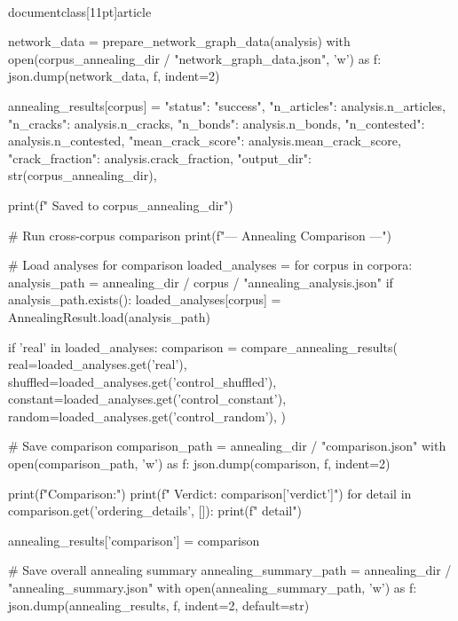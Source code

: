 \\documentclass[11pt]{article}
\begin{document}
\begin{CodeBlock}
                network_data = prepare_network_graph_data(analysis)
                with open(corpus_annealing_dir / "network_graph_data.json", 'w') as f:
                    json.dump(network_data, f, indent=2)

                annealing_results[corpus] = {
                    "status": "success",
                    "n_articles": analysis.n_articles,
                    "n_cracks": analysis.n_cracks,
                    "n_bonds": analysis.n_bonds,
                    "n_contested": analysis.n_contested,
                    "mean_crack_score": analysis.mean_crack_score,
                    "crack_fraction": analysis.crack_fraction,
                    "output_dir": str(corpus_annealing_dir),
                }

                print(f"  Saved to {corpus_annealing_dir}")
            
            # Run cross-corpus comparison
            print(f"\n--- Annealing Comparison ---")

            # Load analyses for comparison
            loaded_analyses = {}
            for corpus in corpora:
                analysis_path = annealing_dir / corpus / "annealing_analysis.json"
                if analysis_path.exists():
                    loaded_analyses[corpus] = AnnealingResult.load(analysis_path)

            if 'real' in loaded_analyses:
                comparison = compare_annealing_results(
                    real=loaded_analyses.get('real'),
                    shuffled=loaded_analyses.get('control_shuffled'),
                    constant=loaded_analyses.get('control_constant'),
                    random=loaded_analyses.get('control_random'),
                )

                # Save comparison
                comparison_path = annealing_dir / "comparison.json"
                with open(comparison_path, 'w') as f:
                    json.dump(comparison, f, indent=2)

                print(f"\nAnnealing Comparison:")
                print(f"  Verdict: {comparison['verdict']}")
                for detail in comparison.get('ordering_details', []):
                    print(f"    {detail}")

                annealing_results['comparison'] = comparison

            # Save overall annealing summary
            annealing_summary_path = annealing_dir / "annealing_summary.json"
            with open(annealing_summary_path, 'w') as f:
                json.dump(annealing_results, f, indent=2, default=str)


\end{CodeBlock}
\end{document}
